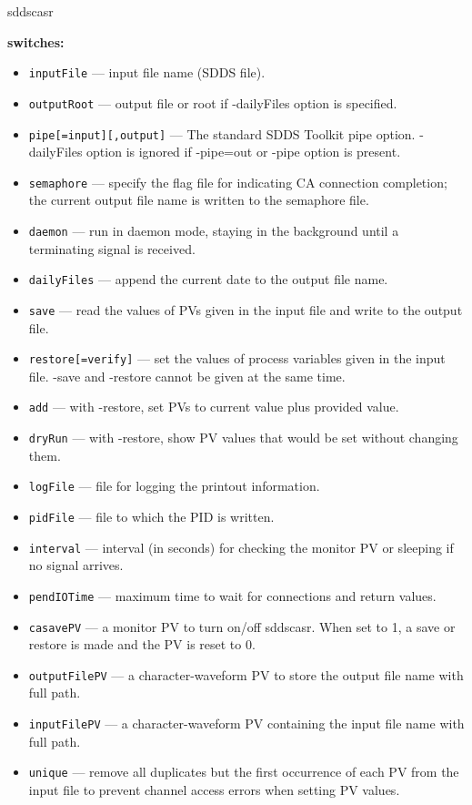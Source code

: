 \begin{sddsprog}{sddscasr}
\item \textbf{switches:}
\begin{itemize}
  \item {\tt inputFile} --- input file name (SDDS file).
  \item {\tt outputRoot} --- output file or root if -dailyFiles option is specified.
  \item {\tt pipe[=input][,output]} --- The standard SDDS Toolkit pipe option.
        -dailyFiles option is ignored if -pipe=out or -pipe option is present.
  \item {\tt semaphore} --- specify the flag file for indicating CA connection completion;
        the current output file name is written to the semaphore file.
  \item {\tt daemon} --- run in daemon mode, staying in the background until a terminating signal is received.
  \item {\tt dailyFiles} --- append the current date to the output file name.
  \item {\tt save} --- read the values of PVs given in the input file and write to the output file.
  \item {\tt restore[=verify]} --- set the values of process variables given in the input file.
        -save and -restore cannot be given at the same time.
  \item {\tt add} --- with -restore, set PVs to current value plus provided value.
  \item {\tt dryRun} --- with -restore, show PV values that would be set without changing them.
  \item {\tt logFile} --- file for logging the printout information.
  \item {\tt pidFile} --- file to which the PID is written.
  \item {\tt interval} --- interval (in seconds) for checking the monitor PV or sleeping if no signal arrives.
  \item {\tt pendIOTime} --- maximum time to wait for connections and return values.
  \item {\tt casavePV} --- a monitor PV to turn on/off sddscasr. When set to 1, a save or restore is made and the PV is reset to 0.
  \item {\tt outputFilePV} --- a character-waveform PV to store the output file name with full path.
  \item {\tt inputFilePV} --- a character-waveform PV containing the input file name with full path.
  \item {\tt unique} --- remove all duplicates but the first occurrence of each PV from the input file to prevent channel access errors when setting PV values.

\end{itemize}
\end{sddsprog}
